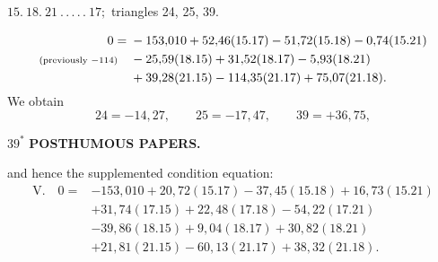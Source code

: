 \par\bigskip
\begin{center}
$15.\ 18.\ 21\ .\,.\,.\,.\,.\ 17;$ triangles 24, 25, 39.
\end{center}
\[
\begin{aligned}
0={}&-153{,}010+52{,}46(15.17)-51{,}72(15.18)-0{,}74(15.21)\\
\text{\scriptsize(previously $-114$)}\quad&-25{,}59(18.15)+31{,}52(18.17)-5{,}93(18.21)\\
&+39{,}28(21.15)-114{,}35(21.17)+75{,}07(21.18).
\end{aligned}
\]
We obtain
\[
24=-14{,}27,\qquad25=-17{,}47,\qquad39=+36{,}75,
\]
\par\smallskip\noindent\hfill$39^\ast$
\newpage
{}\hfill\textbf{POSTHUMOUS PAPERS.}\par\medskip
\noindent and hence the supplemented condition equation:
\[
\begin{aligned}
\mathrm{V.}\quad0={}&-153{,}010+20{,}72(15.17)-37{,}45(15.18)+16{,}73(15.21)\\
&+31{,}74(17.15)+22{,}48(17.18)-54{,}22(17.21)\\
&-39{,}86(18.15)+9{,}04(18.17)+30{,}82(18.21)\\
&+21{,}81(21.15)-60{,}13(21.17)+38{,}32(21.18).
\end{aligned}
\]

